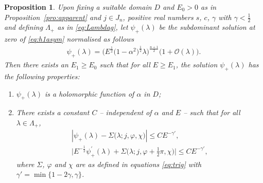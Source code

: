 \documentclass[pdftex]{sigma}
\numberwithin{equation}{section}
\newtheorem{pro}[thm]{Proposition}
\newcommand{\la}{\lambda}
\newcommand{\al}{\alpha}
\begin{document}
\begin{pro}\label{pro:estimateat0}
	Upon fixing a suitable domain $D$ and $E_0>0$ as in Proposition~{\rm \ref{pro:apparent}} and $j\in J_n$, positive real numbers $s$, $c$, $\gamma$ with $\gamma<\frac12$ and defining $\Lambda_+$ as in \eqref{eq:Lambdag}, let $\psi_+(\la)$ be the subdominant solution at zero of \eqref{eq:h1asym} normalised as follows
	\begin{gather*}
	\psi_+(\la)=\big(E^{\frac12}\big(1-\al^2\big)^{\frac12} \la\big)^{\frac{n+1}{2}} \big( 1+ \mathcal{O}(\la) \big).
	\end{gather*}
	Then there exists an $E_1\geq E_0$ such that for all $E\geq E_1$, the solution $\psi_+(\la)$ has the following properties:
	\begin{enumerate}[label={\rm (\roman*)}] \itemsep=0pt
		\item $\psi_+(\la)$ is a holomorphic function of $\al$ in $D$;
		\item There exists a constant $C$ -- independent of $\al$ and $E$ -- such that for all $\la \in \Lambda_{+}$,
		\begin{gather}\nonumber
		 |\psi_+(\la)-\Sigma(\la;j,\varphi,\chi \big)| \leq C E^{-\gamma'} , \\ \label{eq:estimate0}
		\big| E^{-\frac12} \psi_+^{\prime}(\la)+ \Sigma\big(\la;j,\varphi+\tfrac{1}{2}\pi,\chi\big)\big| \leq C E^{-\gamma'} ,
		\end{gather}
		where $\Sigma$, $\varphi$ and $\chi$ are as defined in equations \eqref{eq:trig} with $\gamma'=\min\lbrace1-2\gamma,\gamma \rbrace$.
	\end{enumerate}
\end{pro}
\end{document}
